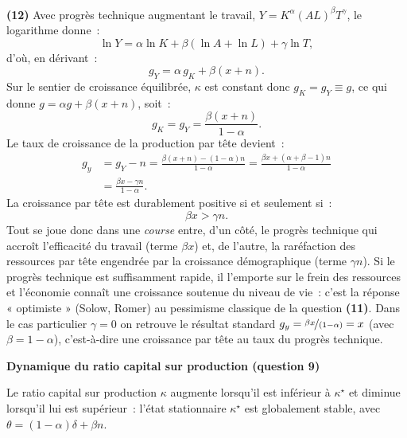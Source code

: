 \documentclass[11pt,a4paper,notitlepage]{article}
\begin{document}
\textbf{(12)} Avec progrès technique augmentant le travail,
$Y=K^{\alpha}(AL)^{\beta}T^{\gamma}$, le logarithme donne~:
\[
\ln Y = \alpha\ln K + \beta(\ln A+\ln L) + \gamma\ln T,
\]
d'où, en dérivant~:
\[
g_Y = \alpha\, g_K + \beta(x+n).
\]
Sur le sentier de croissance équilibrée, $\kappa$ est constant donc
$g_K=g_Y\equiv g$, ce qui donne $g=\alpha g+\beta(x+n)$, soit~:
\[
g_K = g_Y = \frac{\beta(x+n)}{1-\alpha}.
\]
Le taux de croissance de la production par tête devient~:
\[
\begin{split}
g_y &= g_Y - n = \frac{\beta(x+n)-(1-\alpha)n}{1-\alpha}
     = \frac{\beta x + (\alpha+\beta-1)n}{1-\alpha}\\
    &= \frac{\beta x-\gamma n}{1-\alpha}.
\end{split}
\]
La croissance par tête est durablement positive si et seulement si~:
\[
\beta x > \gamma n.
\]
Tout se joue donc dans une \emph{course} entre, d'un côté, le progrès
technique qui accroît l'efficacité du travail (terme $\beta x$) et, de
l'autre, la raréfaction des ressources par tête engendrée par la
croissance démographique (terme $\gamma n$). Si le progrès technique
est suffisamment rapide, il l'emporte sur le frein des ressources et
l'économie connaît une croissance soutenue du niveau de vie~: c'est la
réponse « optimiste » (Solow, Romer) au pessimisme classique de la
question \textbf{(11)}. Dans le cas particulier $\gamma=0$ on retrouve
le résultat standard $g_y=\nicefrac{\beta x}{(1-\alpha)}=x$ (avec
$\beta=1-\alpha$), c'est-à-dire une croissance par tête au taux du
progrès technique.

\newpage

\begin{center}
\textbf{Dynamique du ratio capital sur production (question 9)}\\[1em]
\end{center}

Le ratio capital sur production $\kappa$ augmente lorsqu'il est
inférieur à $\kappa^{\star}$ et diminue lorsqu'il lui est
supérieur~: l'état stationnaire $\kappa^{\star}$ est globalement
stable, avec $\theta=(1-\alpha)\delta+\beta n$.
\end{document}
